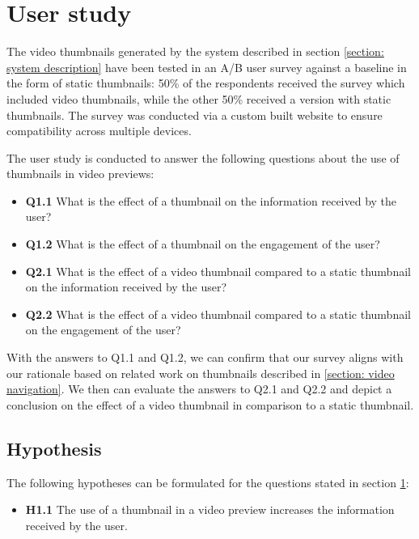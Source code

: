 \documentclass{../resources/sig-alternate-05-2015}
\begin{document}
\section{User study}
\label{section: user study}

The video thumbnails generated by the system described in section \ref{section: system description} have been tested in an A/B user survey against a baseline in the form of static thumbnails: 50\% of the respondents received the survey which included video thumbnails, while the other 50\% received a version with static thumbnails. The survey was conducted via a custom built website to ensure compatibility across multiple devices.

The user study is conducted to answer the following questions about the use of thumbnails in video previews:

\begin{itemize}
	\item \textbf{Q1.1} What is the effect of a thumbnail on the information received by the user?
	\item \textbf{Q1.2} What is the effect of a thumbnail on the engagement of the user?
	\item \textbf{Q2.1} What is the effect of a video thumbnail compared to a static thumbnail on the information received by the user?
	\item \textbf{Q2.2} What is the effect of a video thumbnail compared to a static thumbnail on the engagement of the user?
\end{itemize}

With the answers to Q1.1 and Q1.2, we can confirm that our survey aligns with our rationale based on related work on thumbnails described in \ref{section: video navigation}. We then can evaluate the answers to Q2.1 and Q2.2 and depict a conclusion on the effect of a video thumbnail in comparison to a static thumbnail.

\subsection{Hypothesis}

The following hypotheses can be formulated for the questions stated in section \ref{section: user study}:

\begin{itemize}
	\item \textbf{H1.1} The use of a thumbnail in a video preview increases the information received by the user.
\end{itemize}
\end{document}
